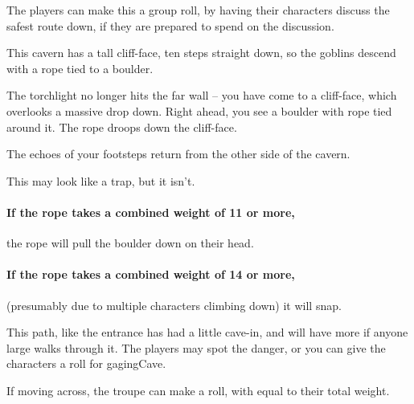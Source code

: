 \begin{multicols}{2}
The players can make this a group roll, by having their characters discuss the safest route down, if they are prepared to spend  on the discussion.




\begin{exampletext}
  This cavern has a tall cliff-face, ten \glspl{step} straight down, so the goblins descend with a rope tied to a boulder.
\end{exampletext}

\begin{boxtext}
  The torchlight no longer hits the far wall -- you have come to a cliff-face, which overlooks a massive drop down.
  Right ahead, you see a boulder with rope tied around it.
  The rope droops down the cliff-face.

  The echoes of your footsteps return from the other side of the cavern.
\end{boxtext}

This may look like a trap, but it isn't.

\paragraph{If the rope takes a combined \gls{weight} of 11 or more,}
the rope will pull the boulder down on their head.

\paragraph{If the rope takes a combined \gls{weight} of 14 or more,}
(presumably due to multiple characters climbing down) it will snap.



This path, like the entrance has had a little cave-in, and will have more if anyone large walks through it.
The players may spot the danger, or you can give the characters a roll for \gls{gagingCave}.

If moving across, the troupe can make a  roll, with  equal to their total \gls{weight}.


\end{multicols}
